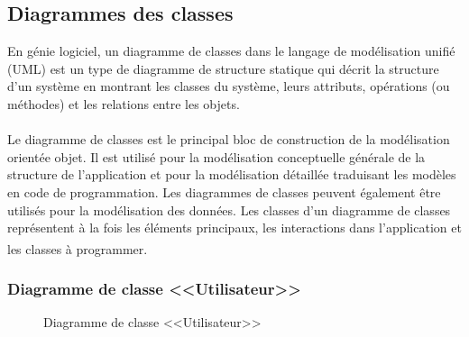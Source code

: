 \documentclass[12pt]{report}
\begin{document}
\newpage

\subsection{Diagrammes des classes}

En génie logiciel, un diagramme de classes dans le langage de modélisation unifié (UML) est un type de diagramme de structure statique qui décrit la structure d'un système en montrant les classes du système, leurs attributs, opérations (ou méthodes) et les relations entre les objets.
\\\\
Le diagramme de classes est le principal bloc de construction de la modélisation orientée objet. Il est utilisé pour la modélisation conceptuelle générale de la structure de l'application et pour la modélisation détaillée traduisant les modèles en code de programmation. Les diagrammes de classes peuvent également être utilisés pour la modélisation des données. Les classes d'un diagramme de classes représentent à la fois les éléments principaux, les interactions dans l'application et les classes à programmer.\textsuperscript{\cite{UIS}}

\vspace{0.1in}

\subsubsection{Diagramme de classe <<Utilisateur>>}

\vspace{0.1in}

\begin{figure}[h]
\centering
    \centerline{}
    \caption{Diagramme de classe <<Utilisateur>>}
\end{figure}
\end{document}
